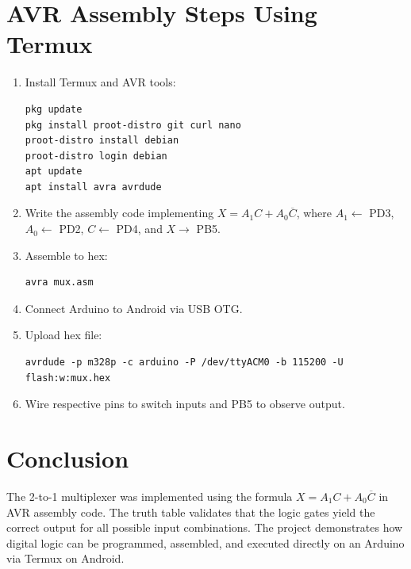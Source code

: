 \documentclass[12pt]{article}
\begin{document}
\section*{AVR Assembly Steps Using Termux}
\begin{enumerate}
    \item Install Termux and AVR tools:
    \begin{verbatim}
pkg update
pkg install proot-distro git curl nano
proot-distro install debian
proot-distro login debian
apt update
apt install avra avrdude
    \end{verbatim}

    \item Write the assembly code implementing $X = A_1C + A_0\overline{C}$, where $A_1 \leftarrow$ PD3, $A_0 \leftarrow$ PD2, $C \leftarrow$ PD4, and $X \rightarrow$ PB5.
    \item Assemble to hex:
    \begin{verbatim}
avra mux.asm
    \end{verbatim}
    \item Connect Arduino to Android via USB OTG.
    \item Upload hex file:
    \begin{verbatim}
avrdude -p m328p -c arduino -P /dev/ttyACM0 -b 115200 -U flash:w:mux.hex
    \end{verbatim}
    \item Wire respective pins to switch inputs and PB5 to observe output.
\end{enumerate}

\section*{Conclusion}
The 2-to-1 multiplexer was implemented using the formula $X = A_1C + A_0\overline{C}$ in AVR assembly code. The truth table validates that the logic gates yield the correct output for all possible input combinations. The project demonstrates how digital logic can be programmed, assembled, and executed directly on an Arduino via Termux on Android.
\end{document}
